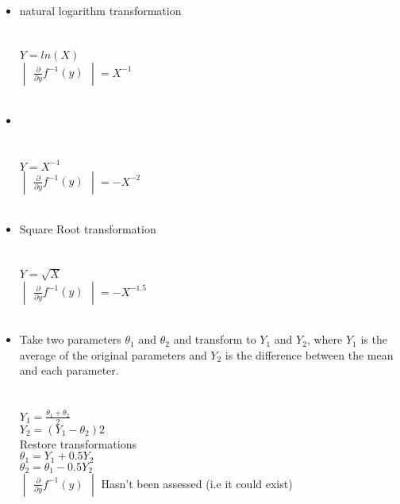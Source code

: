 \begin{itemize}
\item {} natural logarithm transformation\\
\\
\\
$Y = ln(X)$\\
$\begin{vmatrix} \frac{\partial}{\partial y} f^{-1}(y) \end{vmatrix} = X^{-1}$\\\\

\item {}\\
\\
\\
$Y = X^{-1}$\\
$\begin{vmatrix} \frac{\partial}{\partial y} f^{-1}(y) \end{vmatrix} = -X^{-2}$\\\\

\item {} Square Root transformation\\
\\
\\
$Y = \sqrt{X}$\\
$\begin{vmatrix} \frac{\partial}{\partial y} f^{-1}(y) \end{vmatrix} = -X^{-1.5}$\\\\

\item {} Take two parameters $\theta_1$ and $\theta_2$ and transform to $Y_1$ and $Y_2$, where $Y_1$ is the average of the original parameters and $Y_2$ is the difference between the mean and each parameter.\\
\\
\\
$Y_1 = \frac{\theta_1 + \theta_2}{2}$\\
$Y_2 =  (Y_1 - \theta_2)2 $\\
Restore transformations\\
$\theta_1 = Y_1 + 0.5Y_2$\\
$\theta_2 = \theta_1 - 0.5Y_2$\\
$\begin{vmatrix} \frac{\partial}{\partial y} f^{-1}(y) \end{vmatrix}$ Hasn't been assessed (i.e it could exist)\\\\


\end{itemize}

